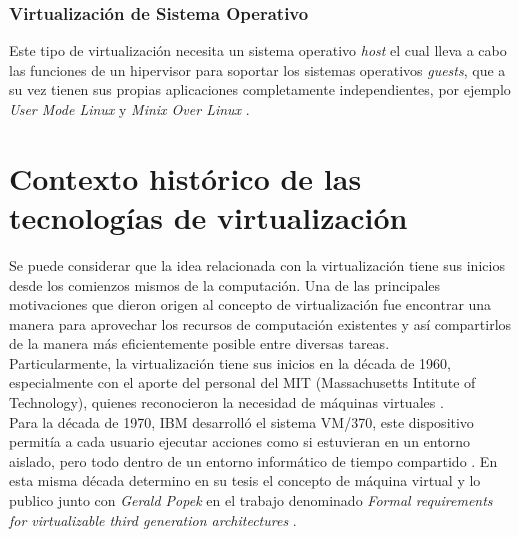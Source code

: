 \subsubsection{Virtualización de Sistema Operativo}
Este tipo de virtualización necesita un sistema operativo \textit{host} el cual lleva a cabo las funciones de un hipervisor para soportar los sistemas operativos \textit{guests},  que a su vez tienen sus propias aplicaciones completamente independientes, por ejemplo \textit{User Mode Linux} \parencite{Dike2006}  y \textit{Minix Over Linux} \parencite{Pessolani2012}.
	
\section{Contexto histórico de las tecnologías de virtualización} \label{historia}

Se puede considerar que la idea relacionada con la virtualización tiene sus inicios desde los comienzos mismos de la computación. Una de las principales motivaciones que dieron origen al concepto de virtualización fue encontrar una manera para aprovechar los recursos de computación existentes y así compartirlos de la manera más eficientemente posible entre diversas tareas. \\

Particularmente, la virtualización tiene sus inicios en la década de 1960, especialmente con el aporte del personal del MIT (Massachusetts Intitute of Technology), quienes reconocieron la necesidad de máquinas virtuales \parencite{ Varian1997, Ameen2013}.\\ 

Para la década de 1970, IBM desarrolló el sistema VM/370, este dispositivo permitía a cada usuario ejecutar acciones como si estuvieran en un entorno aislado, pero todo dentro de un entorno informático de tiempo compartido \parencite{Douglis2013, Varian1997}. En esta misma década \textcite{Goldberg1973} determino en su tesis el concepto de máquina virtual y lo publico junto con \textit{Gerald Popek} en el trabajo  denominado \textit{Formal requirements for virtualizable third generation architectures} \parencite{Popek1974}.\\



